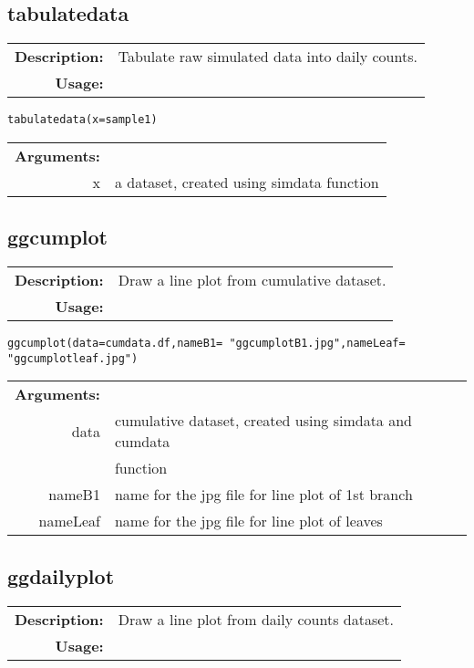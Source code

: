 \subsection{tabulatedata}

\begin{tabular}{rl}
	\textbf{Description:} & Tabulate raw simulated data into daily counts.  \\
	\textbf{Usage:} &
\end{tabular}

\begin{lstlisting}
tabulatedata(x=sample1)
\end{lstlisting}

\begin{tabular}{rl}
	\textbf{Arguments:} &\\
	x & a dataset, created using simdata function\\
\end{tabular}

\subsection{ggcumplot}

\begin{tabular}{rl}
	\textbf{Description:} & Draw a line plot from cumulative dataset.  \\
	\textbf{Usage:} &
\end{tabular}

\begin{lstlisting}
ggcumplot(data=cumdata.df,nameB1= "ggcumplotB1.jpg",nameLeaf= "ggcumplotleaf.jpg")
\end{lstlisting}

\begin{tabular}{rl}
	\textbf{Arguments:} &\\
	data & cumulative dataset, created using simdata and cumdata \\
	& function\\
	nameB1 & name for the jpg file for line plot of 1st branch\\
	nameLeaf & name for the jpg file for line plot of leaves\\
\end{tabular}    

\subsection{ggdailyplot}

\begin{tabular}{rl}
	\textbf{Description:} & Draw a line plot from daily counts dataset. \\
	\textbf{Usage:} &
\end{tabular}

